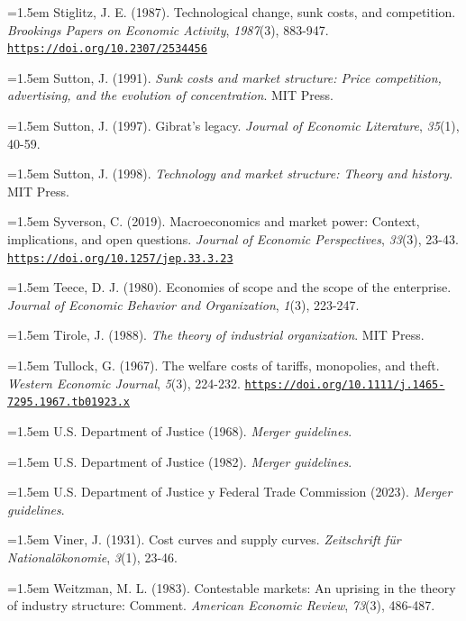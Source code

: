 \documentclass[10pt,a4paper]{article}
\begin{document}
\noindent\hangindent=1.5em Stiglitz, J. E. (1987). Technological change, sunk costs, and competition. \textit{Brookings Papers on Economic Activity}, \textit{1987}(3), 883-947. \href{https://doi.org/10.2307/2534456}{\nolinkurl{https://doi.org/10.2307/2534456}}

\noindent\hangindent=1.5em Sutton, J. (1991). \textit{Sunk costs and market structure: Price competition, advertising, and the evolution of concentration}. MIT Press.

\noindent\hangindent=1.5em Sutton, J. (1997). Gibrat's legacy. \textit{Journal of Economic Literature}, \textit{35}(1), 40-59.

\noindent\hangindent=1.5em Sutton, J. (1998). \textit{Technology and market structure: Theory and history}. MIT Press.

\noindent\hangindent=1.5em Syverson, C. (2019). Macroeconomics and market power: Context, implications, and open questions. \textit{Journal of Economic Perspectives}, \textit{33}(3), 23-43. \href{https://doi.org/10.1257/jep.33.3.23}{\nolinkurl{https://doi.org/10.1257/jep.33.3.23}}

\noindent\hangindent=1.5em Teece, D. J. (1980). Economies of scope and the scope of the enterprise. \textit{Journal of Economic Behavior and Organization}, \textit{1}(3), 223-247.

\noindent\hangindent=1.5em Tirole, J. (1988). \textit{The theory of industrial organization}. MIT Press.

\noindent\hangindent=1.5em Tullock, G. (1967). The welfare costs of tariffs, monopolies, and theft. \textit{Western Economic Journal}, \textit{5}(3), 224-232. \href{https://doi.org/10.1111/j.1465-7295.1967.tb01923.x}{\nolinkurl{https://doi.org/10.1111/j.1465-7295.1967.tb01923.x}}

\noindent\hangindent=1.5em U.S. Department of Justice (1968). \textit{Merger guidelines}.

\noindent\hangindent=1.5em U.S. Department of Justice (1982). \textit{Merger guidelines}.

\noindent\hangindent=1.5em U.S. Department of Justice y Federal Trade Commission (2023). \textit{Merger guidelines}.

\noindent\hangindent=1.5em Viner, J. (1931). Cost curves and supply curves. \textit{Zeitschrift für Nationalökonomie}, \textit{3}(1), 23-46.

\noindent\hangindent=1.5em Weitzman, M. L. (1983). Contestable markets: An uprising in the theory of industry structure: Comment. \textit{American Economic Review}, \textit{73}(3), 486-487.
\end{document}

